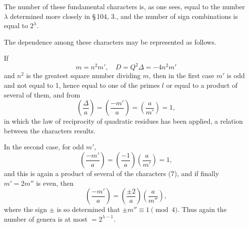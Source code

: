 The number of these fundamental characters is, as one sees, equal to
the number $\lambda$ determined more closely in \S\,104, 3., and the number of
sign combinations is equal to $2^\lambda$.

The dependence among these characters may be represented as
follows.

If
\[
m = n^2 m', \quad D = Q^2\Delta = -4n^2m'
\]
and $n^2$ is the greatest square number dividing $m$, then
in the first case $m'$ is odd and not equal to 1, hence equal to
one of the primes $l$ or equal to a product of several
of them, and from
\[
\left(\frac{\Delta}{a}\right) = \left(\frac{-m'}{a}\right) = \left(\frac{a}{m'}\right) = 1,
\]
in which the law of reciprocity of quadratic residues has been
applied, a relation between the characters results.

In the second case, for odd $m'$,
\[
\left(\frac{-m'}{a}\right) = \left(\frac{-1}{a}\right)\left(\frac{a}{m'}\right) = 1,
\]
and this is again a product of several of the characters (7),
and if finally $m' = 2m''$ is even, then
\[
\left(\frac{-m'}{a}\right) = \left(\frac{\pm 2}{a}\right)\left(\frac{a}{m''}\right),
\]
where the sign $\pm$ is so determined that $\pm m'' \equiv 1 \pmod 4$.
Thus again the number of genera is at most $= 2^{\lambda-1}$.
